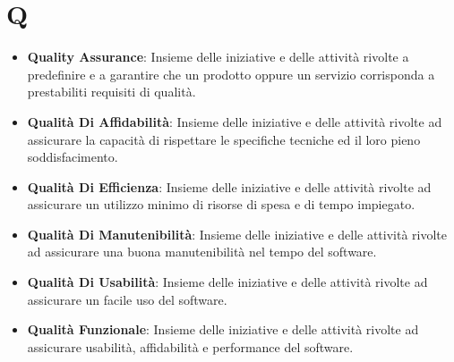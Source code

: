 \section*{Q}
\begin{itemize}
	\item
	\textbf{Quality Assurance}: Insieme delle iniziative e delle attività rivolte a predefinire e a garantire che un prodotto oppure un servizio corrisponda a prestabiliti requisiti di qualità.
	\item
	\textbf{Qualità Di Affidabilità}: Insieme delle iniziative e delle attività rivolte ad assicurare la capacità di rispettare le specifiche tecniche ed il loro pieno soddisfacimento.
	\item
	\textbf{Qualità Di Efficienza}: Insieme delle iniziative e delle attività rivolte ad assicurare un utilizzo minimo di risorse di spesa e di tempo impiegato.
	\item
	\textbf{Qualità Di Manutenibilità}: Insieme delle iniziative e delle attività rivolte ad assicurare una buona manutenibilità nel tempo del software.
	\item
	\textbf{Qualità Di Usabilità}: Insieme delle iniziative e delle attività rivolte ad assicurare un facile uso del software.
	\item
	\textbf{Qualità Funzionale}: Insieme delle iniziative e delle attività rivolte ad assicurare usabilità, affidabilità e performance del software.
\end{itemize}
\newpage